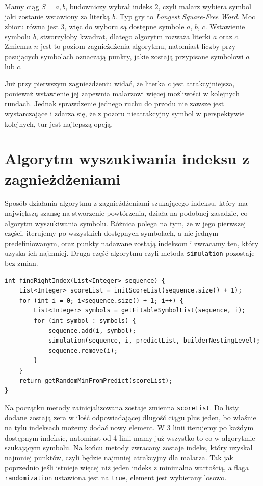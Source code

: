 \documentclass[document]{xmgr}
\begin{document}
Mamy ciąg $S = a, b$, budowniczy wybrał indeks $2$, czyli malarz wybiera symbol jaki zostanie wstawiony za literką $b$. Typ gry to \emph{Longest Square-Free Word}. Moc zbioru równa jest $3$, więc do wyboru są dostępne symbole $a$, $b$, $c$. Wstawienie symbolu $b$, stworzyłoby kwadrat, dlatego algorytm rozważa literki $a$ oraz $c$. Zmienna $n$ jest to poziom zagnieżdżenia algorytmu, natomiast liczby przy pasujących symbolach oznaczają punkty, jakie zostają przypisane symbolowi $a$ lub $c$. 

Już przy pierwszym zagnieżdżeniu widać, że literka $c$ jest atrakcyjniejsza, ponieważ wstawienie jej zapewnia malarzowi więcej możliwości w kolejnych rundach. Jednak sprawdzenie jednego ruchu do przodu nie zawsze jest wystarczające i zdarza się, że z pozoru nieatrakcyjny symbol w perspektywie kolejnych, tur jest najlepszą opcją.

\section{Algorytm wyszukiwania indeksu z zagnieżdżeniami}
Sposób działania algorytmu z zagnieżdżeniami szukającego indeksu, który ma największą szansę na stworzenie powtórzenia, działa na podobnej zasadzie, co algorytm wyszukiwania symbolu. Różnica polega na tym, że w jego pierwszej części, iterujemy po wszystkich dostępnych symbolach, a nie jednym predefiniowanym, oraz punkty nadawane zostają indeksom i zwracamy ten, który uzyska ich najmniej. Druga część algorytmu czyli metoda \texttt{simulation} pozostaje bez zmian.

\begin{lstlisting}[frame=single]
int findRightIndex(List<Integer> sequence) {
	List<Integer> scoreList = initScoreList(sequence.size() + 1);
	for (int i = 0; i<sequence.size() + 1; i++) {
		List<Integer> symbols = getFitableSymbolList(sequence, i);
		for (int symbol : symbols) {
			sequence.add(i, symbol);
			simulation(sequence, i, predictList, builderNestingLevel);
			sequence.remove(i);
		}
	}
	return getRandomMinFromPredict(scoreList);
}
\end{lstlisting}

Na początku metody zainicjalizowana zostaje zmienna \texttt{scoreList}. Do listy dodane zostają zera w ilość odpowiadającej długość ciągu plus jeden, bo właśnie na tylu indeksach możemy dodać nowy element. W 3 linii iterujemy po każdym dostępnym indeksie, natomiast od 4 linii mamy już wszystko to co w algorytmie szukającym symbolu. Na końcu metody zwracany zostaje indeks, który uzyskał najmniej punktów, czyli będzie najmniej atrakcyjny dla malarza. Tak jak poprzednio jeśli istnieje więcej niż jeden indeks z minimalna wartością, a flaga \texttt{randomization} ustawiona jest na \texttt{true}, element jest wybierany losowo.
\end{document}
